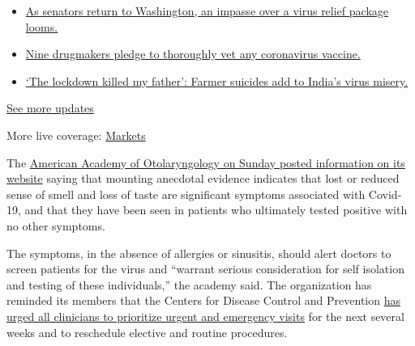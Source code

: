 \begin{itemize}
\tightlist
\item
  \href{https://www.nytimes3xbfgragh.onion/2020/09/08/world/covid-19-coronavirus.html?action=click\&pgtype=Article\&state=default\&region=MAIN_CONTENT_1\&context=storylines_live_updates\#link-4a77847f}{As
  senators return to Washington, an impasse over a virus relief package
  looms.}
\item
  \href{https://www.nytimes3xbfgragh.onion/2020/09/08/world/covid-19-coronavirus.html?action=click\&pgtype=Article\&state=default\&region=MAIN_CONTENT_1\&context=storylines_live_updates\#link-679303d7}{Nine
  drugmakers pledge to thoroughly vet any coronavirus vaccine.}
\item
  \href{https://www.nytimes3xbfgragh.onion/2020/09/08/world/covid-19-coronavirus.html?action=click\&pgtype=Article\&state=default\&region=MAIN_CONTENT_1\&context=storylines_live_updates\#link-1c973131}{`The
  lockdown killed my father': Farmer suicides add to India's virus
  misery.}
\end{itemize}

\href{https://www.nytimes3xbfgragh.onion/2020/09/08/world/covid-19-coronavirus.html?action=click\&pgtype=Article\&state=default\&region=MAIN_CONTENT_1\&context=storylines_live_updates}{See
more updates}

More live coverage:
\href{https://www.nytimes3xbfgragh.onion/live/2020/09/08/business/stock-market-today-coronavirus?action=click\&pgtype=Article\&state=default\&region=MAIN_CONTENT_1\&context=storylines_live_updates}{Markets}

The
\href{https://www.entnet.org/content/coronavirus-disease-2019-resources}{American
Academy of Otolaryngology on Sunday posted information on its website}
saying that mounting anecdotal evidence indicates that lost or reduced
sense of smell and loss of taste are significant symptoms associated
with Covid-19, and that they have been seen in patients who ultimately
tested positive with no other symptoms.

The symptoms, in the absence of allergies or sinusitis, should alert
doctors to screen patients for the virus and ``warrant serious
consideration for self isolation and testing of these individuals,'' the
academy said. The organization has reminded its members that the Centers
for Disease Control and Prevention
\href{https://www.entnet.org/content/new-recommendations-regarding-urgent-and-nonurgent-patient-care}{has
urged all clinicians to prioritize urgent and emergency visits} for the
next several weeks and to reschedule elective and routine procedures.

